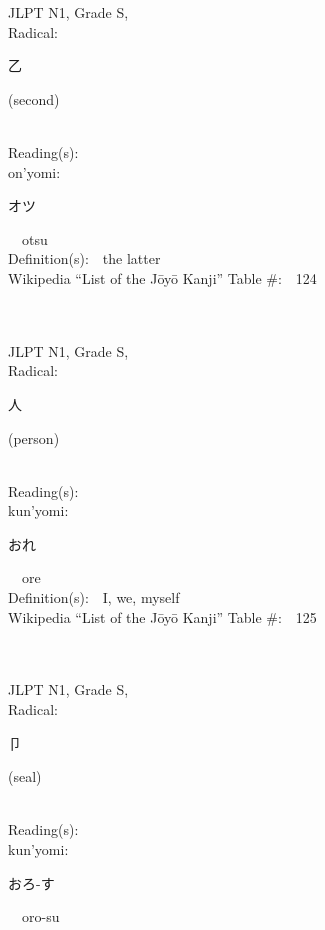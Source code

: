 \begin{multicols}{2}
{JLPT N1, Grade S, \\Radical:\ \ {\begin{CJK}{UTF8}{min} 乙 \end{CJK}} (second) } \\
Reading(s):\ \ \\
{\hspace*{1em}}on'yomi:\ \ \\
{\hspace*{2em}}{\begin{CJK}{UTF8}{min} オツ \end{CJK}}\ \ otsu\ \ \\
Definition(s):\ \ the latter \\
Wikipedia ``List of the J\=oy\=o Kanji'' Table \#:\ \ 124 \\
\ \ \\
{\fontsize{34pt}{40pt}  }\ \ \\
{JLPT N1, Grade S, \\Radical:\ \ {\begin{CJK}{UTF8}{min} 人 \end{CJK}} (person) } \\
Reading(s):\ \ \\
{\hspace*{1em}}kun'yomi:\ \ \\
{\hspace*{2em}}{\begin{CJK}{UTF8}{min} おれ \end{CJK}}\ \ ore\ \ \\
Definition(s):\ \ I, we, myself \\
Wikipedia ``List of the J\=oy\=o Kanji'' Table \#:\ \ 125 \\
\ \ \\
{\fontsize{34pt}{40pt}  }\ \ \\
{JLPT N1, Grade S, \\Radical:\ \ {\begin{CJK}{UTF8}{min} 卩 \end{CJK}} (seal) } \\
Reading(s):\ \ \\
{\hspace*{1em}}kun'yomi:\ \ \\
{\hspace*{2em}}{\begin{CJK}{UTF8}{min} おろ-す \end{CJK}}\ \ oro-su\ \ \\

\end{multicols}
